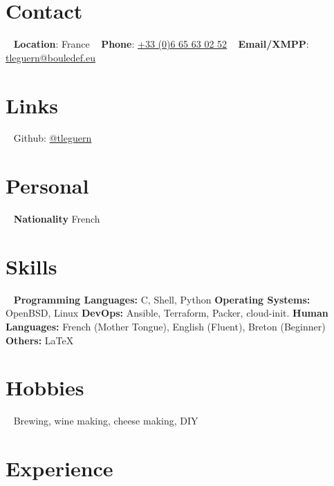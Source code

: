 \documentclass[]{friggeri-cv} %
\begin{document}


\begin{aside} %
\section{Contact}
~
\textbf{Location}: France
~
\textbf{Phone}: \href{tel:0033665630252}{\underline{+33 (0)6 65 63 02 52}}
~
\textbf{Email/XMPP}: \href{mailto:tleguern@bouledef.eu}{\underline{tleguern@bouledef.eu}}
\section {Links}
~
Github: \href{https://github.com/tleguern}{@tleguern}
\section{Personal}
~
\textbf{Nationality}
French
\section{Skills}
~
\textbf{Programming Languages:} C, Shell, Python
\textbf{Operating Systems:} OpenBSD, Linux
\textbf{DevOps:} Ansible, Terraform, Packer, cloud-init.
\textbf{Human Languages:} French (Mother Tongue), English (Fluent), Breton (Beginner)
\textbf{Others:} \LaTeX
\section{Hobbies}
~
Brewing, wine making, cheese making, DIY
\end{aside}


\section{Experience}
\end{document}
